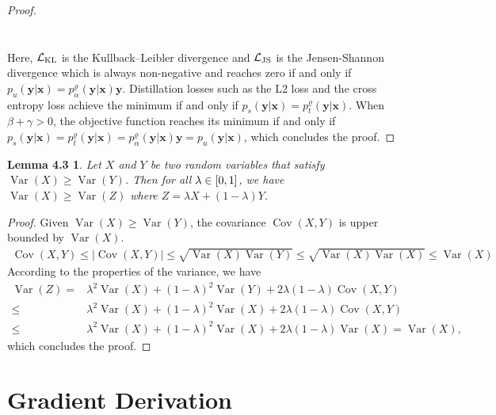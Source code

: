\documentclass{article}
\newtheorem*{lemma1}{Lemma 4.3}
\newcommand{\OVEC}[1]{\bm{#1}} %
\newcommand{\LOSS}[2]{\mathcal{#1}_{\rm{#2}}} %
\DeclareMathOperator{\COV}{Cov}
\DeclareMathOperator{\VAR}{Var}
\newcommand{\fullpdat}{p_{u}(\OVEC{y}|\OVEC{x})}
\newcommand{\fullpstd}[1]{p_{s}(#1|\OVEC{x})}
\newcommand{\fullptch}[1]{p_{t}^{\varrho}(#1|\OVEC{x})}
\newcommand{\fullpmix}{p_{\alpha}^{\varrho}(\OVEC{y}|\OVEC{x})}
\begin{document}
\begin{proof}
\begin{small}
\begin{equation*}
\begin{aligned}
\\
\end{aligned}
\end{equation*}%
\end{small}%
Here, $\LOSS{L}{KL}$ is the Kullback–Leibler divergence and $\LOSS{L}{JS}$ is the Jensen-Shannon divergence which is always non-negative and reaches zero if and only if $\fullpdat=\fullpmix{\OVEC{y}}$.
Distillation losses such as the L2 loss and the cross entropy loss achieve the minimum if and only if $\fullpstd{\OVEC{y}}=\fullptch{\OVEC{y}}$.
When $\beta+\gamma>0$, the objective function reaches its minimum if and only if $\fullpstd{\OVEC{y}}=\fullptch{\OVEC{y}}=\fullpmix{\OVEC{y}}=\fullpdat$, which concludes the proof.
\end{proof}

\begin{lemma1}
Let $X$ and $Y$ be two random variables that satisfy $\VAR(X)\geq\VAR(Y)$.
Then for all $\lambda\in\interval{0}{1}$, we have $\VAR(X)\geq\VAR(Z)$ where $Z = \lambda X+ (1-\lambda) Y$.
\end{lemma1}
 
\begin{proof}
Given $\VAR(X)\geq\VAR(Y)$, the covariance $\COV(X,Y)$ is upper bounded by $\VAR(X)$.
\begin{equation}
\begin{aligned}
\COV(X,Y)
\leq
|\COV(X,Y)|
\leq
\sqrt{\VAR(X)\VAR(Y)}
\leq
\sqrt{\VAR(X)\VAR(X)}
\leq
\VAR(X)
\end{aligned}
\end{equation}%
According to the properties of the variance, we have
\begin{equation}
\begin{aligned}
\VAR(Z)
=
&
\lambda^{2}\VAR(X)
+
(1-\lambda)^{2}\VAR(Y)
+
2\lambda(1-\lambda)\COV(X,Y)
\\
\leq
&
\lambda^{2}\VAR(X)
+
(1-\lambda)^{2}\VAR(X)
+
2\lambda(1-\lambda)\COV(X,Y)
\\
\leq
&
\lambda^{2}\VAR(X)
+
(1-\lambda)^{2}\VAR(X)
+
2\lambda(1-\lambda)\VAR(X)
=
\VAR(X)
\text{,}
\end{aligned}
\end{equation}%
which concludes the proof.
\end{proof}

\section{Gradient Derivation} \label{app:gradient}
\end{document}
